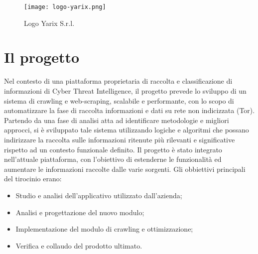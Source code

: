 \begin{figure}[!h] 
    \centering 
    \texttt{[image: logo-yarix.png]} 
    \caption{Logo Yarix S.r.l.}
\end{figure}

\section{Il progetto}

Nel contesto di una piattaforma proprietaria di raccolta e classificazione di informazioni di Cyber Threat Intelligence, il progetto prevede lo sviluppo di un sistema di crawling e web-scraping, scalabile e performante, con lo scopo di automatizzare la fase di raccolta informazioni e dati su rete non indicizzata (Tor). Partendo da una fase di analisi atta ad identificare metodologie e migliori approcci, si è sviluppato tale sistema utilizzando logiche e algoritmi che possano indirizzare la raccolta sulle informazioni ritenute più rilevanti e significative rispetto ad un contesto funzionale definito.\newline{}
Il progetto è stato integrato nell'attuale piattaforma, con l'obiettivo di estenderne le funzionalità ed aumentare le informazioni raccolte dalle varie sorgenti.\newline{} Gli obbiettivi principali del tirocinio erano: \newline{}
\begin{itemize}
	\item Studio e analisi dell'applicativo utilizzato dall’azienda;
	\item Analisi e progettazione del nuovo modulo;
	\item Implementazione del modulo di crawling e ottimizzazione;
	\item Verifica e collaudo del prodotto ultimato.
\end{itemize}
